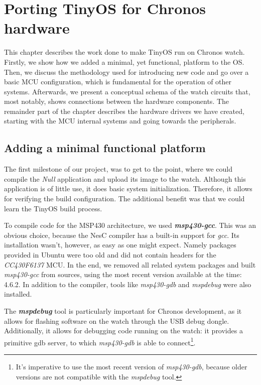 \chapter{Porting TinyOS for Chronos hardware}
\label{ch:porting}

This chapter describes the work done to make TinyOS run on Chronos watch. Firstly, we show how we added a minimal, yet functional, platform to the OS. Then, we discuss the methodology used for introducing new code and go over a basic MCU configuration, which is fundamental for the operation of other systems. Afterwards, we present a conceptual schema of the watch circuits that, most notably, shows connections between the hardware components. The remainder part of the chapter describes the hardware drivers we have created, starting with the MCU internal systems and going towards the peripherals.

\section{Adding a minimal functional platform}

The first milestone of our project, was to get to the point, where we could compile the \emph{Null} application and upload its image to the watch. Although this application is of little use, it does basic system initialization. Therefore, it allows for verifying the build configuration. The additional benefit was that we could learn the TinyOS build process.

To compile code for the MSP430 architecture, we used \emph{\bf msp430-gcc}. This was an obvious choice, because the NesC compiler has a built-in support for \emph{gcc}. Its installation wasn't, however, as easy as one might expect. Namely packages provided in Ubuntu were too old and did not contain headers for the \emph{CC430F6137} MCU. In the end, we removed all related system packages and built \emph{msp430-gcc} from sources, using the most recent version available at the time: 4.6.2.  In addition to the compiler, tools like \emph{msp430-gdb} and \emph{mspdebug} were also installed.

The \emph{\bf mspdebug} tool is particularly important for Chronos development, as it allows for flashing software on the watch through the USB debug dongle.  Additionally, it allows for debugging code running on the watch: it provides a primitive gdb server, to which \emph{msp430-gdb} is able to connect\footnote{It's imperative to use the most recent version of \emph{msp430-gdb}, because older versions are not compatible with the \emph{mspdebug} tool.}.

